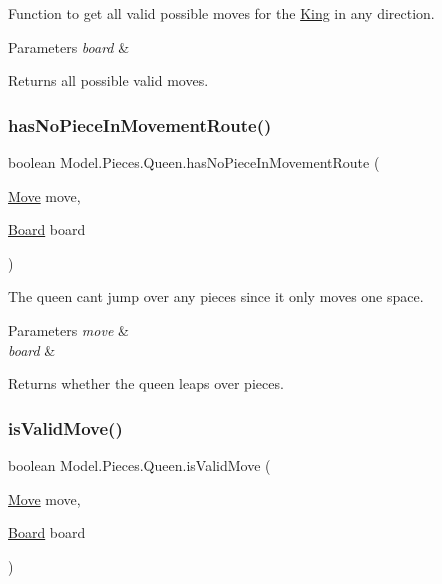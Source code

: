 Function to get all valid possible moves for the \hyperlink{class_model_1_1_pieces_1_1_king}{King} in any direction. 
\begin{DoxyParams}{Parameters}
{\em board} & \\
\hline
\end{DoxyParams}
\begin{DoxyReturn}{Returns}
all possible valid moves. 
\end{DoxyReturn}
\hypertarget{class_model_1_1_pieces_1_1_queen_a816cf5f71e321e7a084999db678a01c5}{}\label{class_model_1_1_pieces_1_1_queen_a816cf5f71e321e7a084999db678a01c5} 
\subsubsection{\texorpdfstring{has\+No\+Piece\+In\+Movement\+Route()}{hasNoPieceInMovementRoute()}}
{\footnotesize\ttfamily boolean Model.\+Pieces.\+Queen.\+has\+No\+Piece\+In\+Movement\+Route (\begin{DoxyParamCaption}\item[{\hyperlink{class_model_1_1_move}{Move}}]{move,  }\item[{\hyperlink{class_model_1_1_board}{Board}}]{board }\end{DoxyParamCaption})}

The queen can\textquotesingle{}t jump over any pieces since it only moves one space. 
\begin{DoxyParams}{Parameters}
{\em move} & \\
\hline
{\em board} & \\
\hline
\end{DoxyParams}
\begin{DoxyReturn}{Returns}
whether the queen leaps over pieces. 
\end{DoxyReturn}
\hypertarget{class_model_1_1_pieces_1_1_queen_a60af220d259d96efdc25e940774fd804}{}\label{class_model_1_1_pieces_1_1_queen_a60af220d259d96efdc25e940774fd804} 
\subsubsection{\texorpdfstring{is\+Valid\+Move()}{isValidMove()}}
{\footnotesize\ttfamily boolean Model.\+Pieces.\+Queen.\+is\+Valid\+Move (\begin{DoxyParamCaption}\item[{\hyperlink{class_model_1_1_move}{Move}}]{move,  }\item[{\hyperlink{class_model_1_1_board}{Board}}]{board }\end{DoxyParamCaption})}

